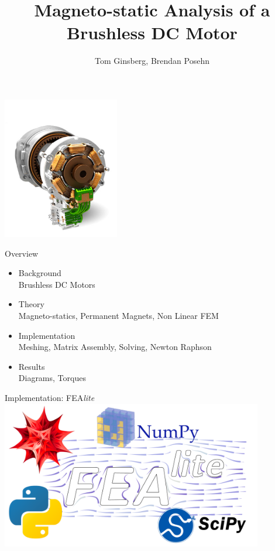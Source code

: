 \documentclass{beamer}
\title[Your Short Title]{Magneto-static Analysis of a Brushless DC Motor}
\author{\small Tom Ginsberg, Brendan Posehn}
\date{}
\begin{document}
\begin{frame}
    \vspace{0.5cm}
  \titlepage
    \vspace{-1.5cm}
  \begin{center}
    \includegraphics[width=2in]{render.png}
\end{center}
\end{frame}

\begin{frame}{Overview}
\begin{itemize}
  \item {\large Background}\\
  Brushless DC Motors
  \item {\large Theory}\\
  Magneto-statics, Permanent Magnets, Non Linear FEM
  \item {\large Implementation}\\
  Meshing, Matrix Assembly, Solving, Newton Raphson
  \item {\large Results}\\
  Diagrams, Torques
\end{itemize}

\end{frame}
\begin{frame}{Implementation: FEA\textit{lite}}
\hspace{-0.72cm}
\includegraphics[width=4.5in]{technology.pdf}

\end{frame}
\end{document}
